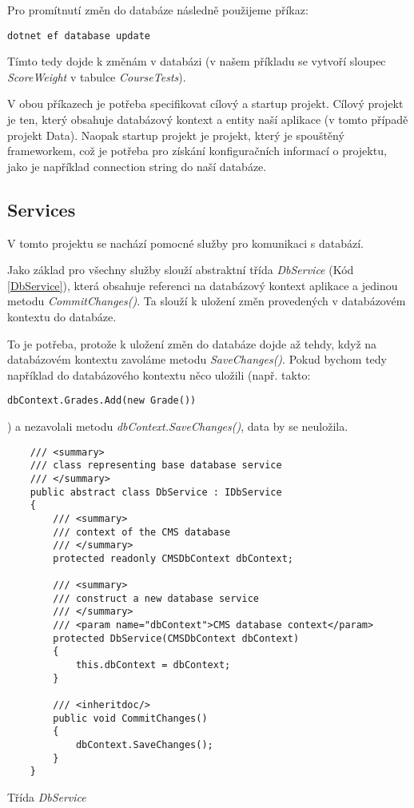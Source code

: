 Pro promítnutí změn do databáze následně použijeme příkaz:

\begin{lstlisting}
dotnet ef database update
\end{lstlisting}

Tímto tedy dojde k změnám v databázi (v našem příkladu se vytvoří sloupec \textit{ScoreWeight} v tabulce \textit{CourseTests}).

V obou příkazech je potřeba specifikovat cílový a startup projekt. Cílový projekt je ten, který obsahuje databázový kontext a entity naší aplikace (v tomto případě projekt Data). Naopak startup projekt je projekt, který je spouštěný frameworkem, což je potřeba pro získání konfiguračních informací o projektu, jako je například connection string do naší databáze.

\subsection{Services}
V tomto projektu se nachází pomocné služby pro komunikaci s databází. 

Jako základ pro všechny služby slouží abstraktní třída \textit{DbService} (Kód \ref{DbService}), která obsahuje referenci na databázový kontext aplikace a jedinou metodu \textit{CommitChanges()}. Ta slouží k uložení změn provedených v databázovém kontextu do databáze. 

To je potřeba, protože k uložení změn do databáze dojde až tehdy, když na databázovém kontextu zavoláme metodu \textit{SaveChanges()}. Pokud bychom tedy například do databázového kontextu něco uložili (např. takto: 
\begin{lstlisting}
dbContext.Grades.Add(new Grade())
\end{lstlisting})
a nezavolali metodu \textit{dbContext.SaveChanges()}, data by se neuložila.

\begin{program}
	\begin{lstlisting}
	/// <summary>
	/// class representing base database service
	/// </summary>
	public abstract class DbService : IDbService
	{
		/// <summary>
		/// context of the CMS database
		/// </summary>
		protected readonly CMSDbContext dbContext;
		
		/// <summary>
		/// construct a new database service
		/// </summary>
		/// <param name="dbContext">CMS database context</param>
		protected DbService(CMSDbContext dbContext)
		{
			this.dbContext = dbContext;
		}
		
		/// <inheritdoc/>
		public void CommitChanges()
		{
			dbContext.SaveChanges();
		}
	}
	\end{lstlisting}
	\caption{Třída \textit{DbService}}
	\label{DbService}
\end{program}

